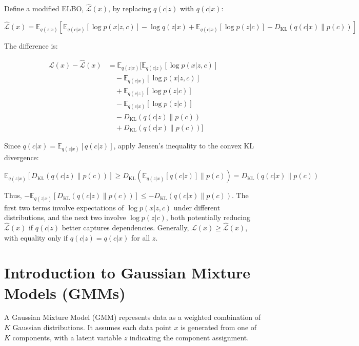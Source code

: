 \documentclass[12pt]{article}
\numberwithin{equation}{section}
\begin{document}
Define a modified ELBO, \( \hat{\mathcal{L}}(x) \), by replacing \( q(c|z) \) with \( q(c|x) \):

\[
\hat{\mathcal{L}}(x) = \mathbb{E}_{q(z | x)} \left[ \mathbb{E}_{q(c | x)} \left[ \log p(x | z, c) \right] - \log q(z | x) + \mathbb{E}_{q(c | x)} \left[ \log p(z | c) \right] - D_{\text{KL}}(q(c | x) \| p(c)) \right]
\]

The difference is:


\begin{equation}
\begin{aligned}
\mathcal{L}(x) - \hat{\mathcal{L}}(x)
&= \mathbb{E}_{q(z | x)} \Big[ \mathbb{E}_{q(c | z)} \left[ \log p(x | z, c) \right] \\
&\quad - \mathbb{E}_{q(c | x)} \left[ \log p(x | z, c) \right]  \\
&\quad + \mathbb{E}_{q(c | z)} \left[ \log p(z | c) \right] \\
&\quad - \mathbb{E}_{q(c | x)} \left[ \log p(z | c) \right] \\
&\quad - D_{\text{KL}}(q(c | z) \| p(c)) \\
&\quad + D_{\text{KL}}(q(c | x) \| p(c)) \Big]
\end{aligned}
\end{equation}

Since \( q(c|x) = \mathbb{E}_{q(z|x)} [q(c|z)] \), apply Jensen's inequality to the convex KL divergence:

\[
\mathbb{E}_{q(z | x)} \left[ D_{\text{KL}}(q(c | z) \| p(c)) \right] \geq D_{\text{KL}} \left( \mathbb{E}_{q(z | x)} [q(c | z)] \| p(c) \right) = D_{\text{KL}}(q(c | x) \| p(c))
\]

Thus, \( - \mathbb{E}_{q(z | x)} [D_{\text{KL}}(q(c | z) \| p(c))] \leq - D_{\text{KL}}(q(c | x) \| p(c)) \). The first two terms involve expectations of \( \log p(x | z, c) \) under different distributions, and the next two involve \( \log p(z | c) \), both potentially reducing \( \hat{\mathcal{L}}(x) \) if \( q(c|z) \) better captures dependencies. Generally, \( \mathcal{L}(x) \geq \hat{\mathcal{L}}(x) \), with equality only if \( q(c|z) = q(c|x) \) for all \( z \).

\section{Introduction to Gaussian Mixture Models (GMMs)}
A Gaussian Mixture Model (GMM) represents data as a weighted combination of \(K\) Gaussian distributions. It assumes each data point \(x\) is generated from one of \(K\) components, with a latent variable \(z\) indicating the component assignment.
\end{document}
